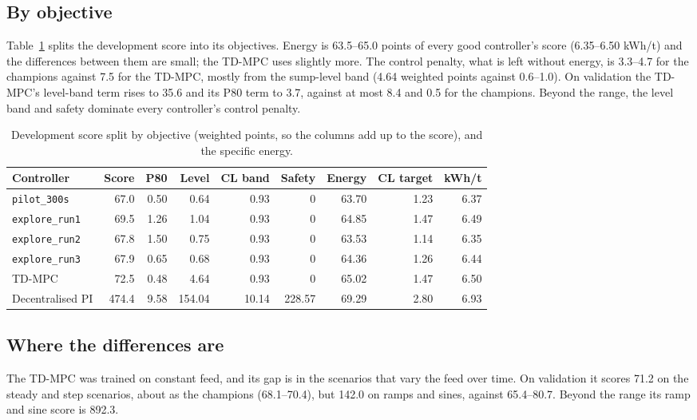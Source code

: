 \subsection{By objective}
\label{sec:mill-perspectives}
Table~\ref{tab:mill-terms} splits the development score into its objectives.
Energy is 63.5--65.0 points of every good controller's score (6.35--6.50
kWh/t) and the differences between them are small; the TD-MPC uses slightly
more. The control penalty, what is left without energy, is 3.3--4.7 for the
champions against 7.5 for the TD-MPC, mostly from the sump-level band (4.64
weighted points against 0.6--1.0). On validation the TD-MPC's level-band term
rises to 35.6 and its P80 term to 3.7, against at most 8.4 and 0.5 for the
champions. Beyond the range, the level band and safety dominate every
controller's control penalty.

\begin{table}[tb]
  \centering
  \caption{Development score split by objective (weighted points, so the
    columns add up to the score), and the specific energy.}
  \label{tab:mill-terms}
  \small\setlength{\tabcolsep}{3pt}
  \begin{tabular}{@{}lrrrrrrrr@{}}
    \toprule
    Controller & Score & P80 & Level & CL band & Safety & Energy & CL target & kWh/t \\
    \midrule
    \texttt{pilot\_300s}   & 67.0 & 0.50 & 0.64 & 0.93 & 0 & 63.70 & 1.23 & 6.37 \\
    \texttt{explore\_run1} & 69.5 & 1.26 & 1.04 & 0.93 & 0 & 64.85 & 1.47 & 6.49 \\
    \texttt{explore\_run2} & 67.8 & 1.50 & 0.75 & 0.93 & 0 & 63.53 & 1.14 & 6.35 \\
    \texttt{explore\_run3} & 67.9 & 0.65 & 0.68 & 0.93 & 0 & 64.36 & 1.26 & 6.44 \\
    TD-MPC                 & 72.5 & 0.48 & 4.64 & 0.93 & 0 & 65.02 & 1.47 & 6.50 \\
    Decentralised PI       & 474.4 & 9.58 & 154.04 & 10.14 & 228.57 & 69.29 & 2.80 & 6.93 \\
    \bottomrule
  \end{tabular}
\end{table}

\subsection{Where the differences are}
\label{sec:mill-where}
The TD-MPC was trained on constant feed, and its gap is in the scenarios that
vary the feed over time. On validation it scores 71.2 on the steady and step
scenarios, about as the champions (68.1--70.4), but 142.0 on ramps and sines,
against 65.4--80.7. Beyond the range its ramp and sine score is 892.3.

